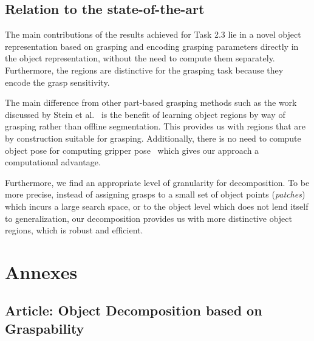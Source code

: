 \documentclass[a4paper,11pt,pdf]{pacmanreport}
\begin{document}
\subsection{Relation to the state-of-the-art}


The main contributions of the results achieved for Task 2.3 lie in a
novel object representation based on grasping and encoding grasping
parameters directly in the object representation, without the need to
compute them separately. Furthermore, the regions are distinctive for
the grasping task because they encode the grasp sensitivity.

The main difference from other part-based grasping methods such as the
work discussed by Stein et al.~\cite{lccp-grasp} is the benefit of
learning object regions by way of grasping rather than offline
segmentation. This provides us with regions that are by construction
suitable for grasping. Additionally, there is no need to compute
object pose for computing gripper
pose~\cite{saxena_grasp_novel_objects} which gives our approach a
computational advantage.

Furthermore, we find an appropriate level of granularity for
decomposition. To be more precise, instead of assigning grasps to a
small set of object points (\emph{patches})
\cite{saxena_deep_grasps,grasping_ng,grasping_mrf,kopicki2015a} which
incurs a large search space, or to the object level which does not
lend itself to generalization, our decomposition provides us with more
distinctive object regions, which is robust and efficient.




\newpage

\appendix
\section{Annexes}
\label{ann}


\subsection{Article: Object Decomposition based on Graspability}
\label{ann:wacv}
\end{document}
